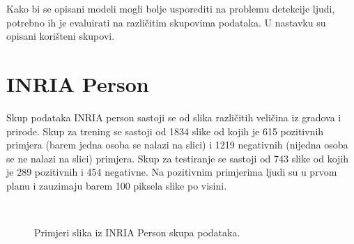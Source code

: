 Kako bi se opisani modeli mogli bolje usporediti na problemu detekcije ljudi, potrebno ih je evaluirati na različitim skupovima podataka. U nastavku su opisani korišteni skupovi.

\section{INRIA Person}
Skup podataka INRIA person sastoji se od slika različitih veličina iz gradova i prirode. Skup za trening se sastoji od 1834 slike od kojih je 615 pozitivnih primjera (barem jedna osoba se nalazi na slici) i 1219 negativnih (nijedna osoba se ne nalazi na slici) primjera. Skup za testiranje se sastoji od 743 slike od kojih je 289 pozitivnih i 454 negativne.
Na pozitivnim primjerima ljudi su u prvom planu i zauzimaju barem 100 piksela slike po visini.

\begin{figure}[H]
 \
 \
\caption{Primjeri slika iz INRIA Person skupa podataka.}
\end{figure}

